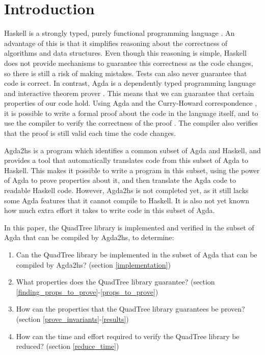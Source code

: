 \section{Introduction}
Haskell is a strongly typed, purely functional programming language \cite{haskell}. An advantage of this is that it simplifies reasoning about the correctness of algorithms and data structures. Even though this reasoning is simple, Haskell does not provide mechanisms to guarantee this correctness as the code changes, so there is still a risk of making mistakes. Tests can also never guarantee that code is correct. In contrast, Agda is a dependently typed programming language and interactive theorem prover \cite{agda}. This means that we can guarantee that certain properties of our code hold. Using Agda and the Curry-Howard correspondence \cite{chc}, it is possible to write a formal proof about the code in the language itself, and to use the compiler to verify the correctness of the proof \cite{schwaab, van}. The compiler also verifies that the proof is still valid each time the code changes.

Agda2hs \cite{agda2hs} is a program which identifies a common subset of Agda and Haskell, and provides a tool that automatically translates code from this subset of Agda to Haskell. This makes it possible to write a program in this subset, using the power of Agda to prove properties about it, and then translate the Agda code to readable Haskell code. However, Agda2hs is not completed yet, as it still lacks some Agda features that it cannot compile to Haskell. It is also not yet known how much extra effort it takes to write code in this subset of Agda.

In this paper, the QuadTree library is implemented and verified in the subset of Agda that can be compiled by Agda2hs, to determine:
\begin{enumerate}[label=(\roman*)]
	\itemsep-0.2em 
	\item Can the QuadTree library be implemented in the subset of Agda that can be compiled by Agda2hs? (section \ref{implementation})
	\item What properties does the QuadTree library guarantee? (section \ref{finding_props_to_prove}-\ref{props_to_prove})
	\item How can the properties that the QuadTree library guarantees be proven? (section \ref{prove_invariants}-\ref{results})
	\item How can the time and effort required to verify the QuadTree library be reduced? (section \ref{reduce_time})
\end{enumerate}
